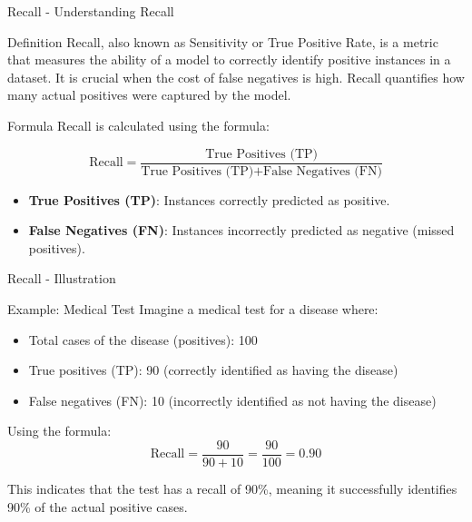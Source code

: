 \documentclass[aspectratio=169]{beamer}
\begin{document}
\begin{frame}[fragile]{Recall - Understanding Recall}
    \begin{block}{Definition}
        Recall, also known as Sensitivity or True Positive Rate, is a metric that measures the ability of a model to correctly identify positive instances in a dataset. It is crucial when the cost of false negatives is high. Recall quantifies how many actual positives were captured by the model.
    \end{block}

    \begin{block}{Formula}
        Recall is calculated using the formula:

        \begin{equation}
        \text{Recall} = \frac{\text{True Positives (TP)}}{\text{True Positives (TP)} + \text{False Negatives (FN)}}
        \end{equation}
    \end{block}

    \begin{itemize}
        \item \textbf{True Positives (TP)}: Instances correctly predicted as positive.
        \item \textbf{False Negatives (FN)}: Instances incorrectly predicted as negative (missed positives).
    \end{itemize}
\end{frame}

\begin{frame}[fragile]{Recall - Illustration}
    \begin{block}{Example: Medical Test}
        Imagine a medical test for a disease where:
        \begin{itemize}
            \item Total cases of the disease (positives): 100
            \item True positives (TP): 90 (correctly identified as having the disease)
            \item False negatives (FN): 10 (incorrectly identified as not having the disease)
        \end{itemize}

        Using the formula:
        \begin{equation}
        \text{Recall} = \frac{90}{90 + 10} = \frac{90}{100} = 0.90
        \end{equation}

        This indicates that the test has a recall of 90\%, meaning it successfully identifies 90\% of the actual positive cases.
    \end{block}
\end{frame}
\end{document}
